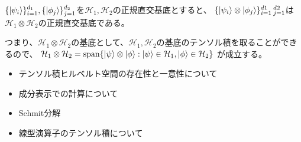 \begin{Meidai}
  $\{\ket{\psi_i}\}_{i=1}^{d_1},\{\ket{\phi_j}\}_{j=1}^{d_2}$を$\mathcal{H}_1,\mathcal{H}_2$の正規直交基底とすると、
  $\{\ket{\psi_i} \otimes \ket{\phi_j} \}_{i=1}^{d1}\,_{j=1}^{d2}$は$\mathcal{H}_1\otimes\mathcal{H}_2$の正規直交基底である。
\end{Meidai}
つまり、$\mathcal{H}_1\otimes\mathcal{H}_2$の基底として、$\mathcal{H}_1,\mathcal{H}_2$の基底のテンソル積を取ることができるので、
$\mathcal{H}_1\otimes\mathcal{H}_2 = \text{span}\{\ket{\psi}\otimes\ket{\phi} : \ket{\psi}\in\mathcal{H}_1, \ket{\phi}\in\mathcal{H}_2 \}$
が成立する。

\begin{Memo}
  \begin{itemize}
    \item テンソル積ヒルベルト空間の存在性と一意性について
    \item 成分表示での計算について
    \item Schmit分解
    \item 線型演算子のテンソル積について
  \end{itemize}
\end{Memo}
